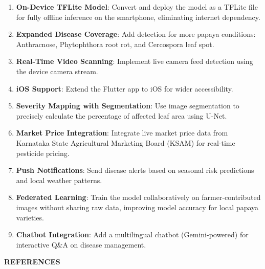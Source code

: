 \documentclass[12pt,a4paper]{report}
\begin{document}
\begin{enumerate}
    \item \textbf{On-Device TFLite Model}: Convert and deploy the model as a TFLite file for fully offline inference on the smartphone, eliminating internet dependency.
    \item \textbf{Expanded Disease Coverage}: Add detection for more papaya conditions: Anthracnose, Phytophthora root rot, and Cercospora leaf spot.
    \item \textbf{Real-Time Video Scanning}: Implement live camera feed detection using the device camera stream.
    \item \textbf{iOS Support}: Extend the Flutter app to iOS for wider accessibility.
    \item \textbf{Severity Mapping with Segmentation}: Use image segmentation to precisely calculate the percentage of affected leaf area using U-Net.
    \item \textbf{Market Price Integration}: Integrate live market price data from Karnataka State Agricultural Marketing Board (KSAM) for real-time pesticide pricing.
    \item \textbf{Push Notifications}: Send disease alerts based on seasonal risk predictions and local weather patterns.
    \item \textbf{Federated Learning}: Train the model collaboratively on farmer-contributed images without sharing raw data, improving model accuracy for local papaya varieties.
    \item \textbf{Chatbot Integration}: Add a multilingual chatbot (Gemini-powered) for interactive Q\&A on disease management.
\end{enumerate}

\newpage
\begin{center}
{\Large\bfseries REFERENCES}
\end{center}
\end{document}
